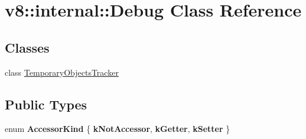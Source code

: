 \hypertarget{classv8_1_1internal_1_1Debug}{}\section{v8\+:\+:internal\+:\+:Debug Class Reference}
\label{classv8_1_1internal_1_1Debug}
\subsection*{Classes}
\begin{DoxyCompactItemize}
\item 
class \mbox{\hyperlink{classv8_1_1internal_1_1Debug_1_1TemporaryObjectsTracker}{Temporary\+Objects\+Tracker}}
\end{DoxyCompactItemize}
\subsection*{Public Types}
\begin{DoxyCompactItemize}
\item 
\mbox{\label{classv8_1_1internal_1_1Debug_ad512602691523935ff7db7bc6c5613cb}} 
enum {\bfseries Accessor\+Kind} \{ {\bfseries k\+Not\+Accessor}, 
{\bfseries k\+Getter}, 
{\bfseries k\+Setter}
 \}
\end{DoxyCompactItemize}
